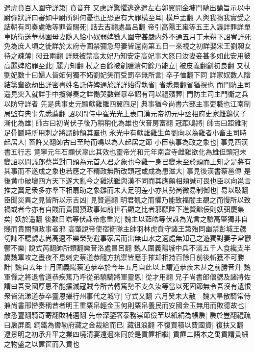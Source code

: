 遣虎賁百人圍守詳第|{
	賁音奔}
又慮詳驚懼逃逸遣左右郭翼開金墉門馳出諭旨示以中尉彈狀詳曰審如中尉所糾何憂也正恐更有大罪橫至耳|{
	橫戶孟翻}
人與我物我實受之詰朝有司奏處皓等罪皆賜死|{
	詰去吉翻處昌呂翻}
帝引高陽王雍等五王入議詳罪詳單車防衛送華林園母妻隨入給小奴弱婢數人圍守甚嚴内外不通五月丁未朔下詔宥詳死免為庶人頃之徙詳於太府寺圍禁彌急母妻皆還南第五日一來視之初詳娶宋王劉昶女待之疎薄|{
	昶丑兩翻}
詳既被禁高太妃乃知安定高妃事大怒曰汝妻妾甚多如此安用彼高麗婢陷罪至此|{
	麗力知翻}
杖之百餘被創膿潰旬餘乃能立|{
	被皮義翻創初良翻}
又杖劉妃數十曰婦人皆妬何獨不妬劉妃笑而受罰卒無所言|{
	卒子恤翻下同}
詳家奴數人陰結黨輩欲劫出詳密書姓名託侍婢通於詳詳始得執省|{
	省悉景翻省猶視也}
而門防主司遥見突入就詳手中攬得奏之詳慟哭數聲暴卒詔有司以禮殯葬|{
	門防主司主門衛之兵以防守詳者}
先是典事史元顯獻雞雛四翼四足|{
	典事猶今尚書六部主事吏職也江南制局監有典事先悉薦翻}
詔以問侍中崔光光上表曰漢元帝初元中丞相府史家雌鷄伏子漸化為雄|{
	師古曰初尚伏子後乃稍稍化為雄也伏音房富翻}
冠距鳴將|{
	師古曰距雞附足骨鬭時所用刺之將謂帥領其羣也}
永光中有獻雄雞生角劉向以為雞者小畜主司時起居人|{
	畜許又翻師古曰至時而鳴以為人起居之節}
小臣執事為政之象也|{
	事見西漢書五行志}
竟寧元年石顯伏辜此其效也靈帝光和元年南宫寺雌雞欲化為雄但頭冠未變詔以問議郎蔡邕對曰頭為元首人君之象也今雞一身已變未至於頭而上知之是將有其事而不遂成之象也若應之不精政無所改頭冠或成為患滋大|{
	事見後漢書蔡邕傳}
是後黄巾破壞四方天下遂大亂今之雞狀雖與漢不同而其應頗相類誠可畏也臣以向邕言推之翼足衆多亦羣下相扇助之象雛而未大足羽差小亦其勢尚微易制御也|{
	易以豉翻}
臣聞災異之見皆所以示吉凶|{
	見賢遍翻}
明君覩之而懼乃能致福闇主覩之而慢所以致禍或者今亦有自賤而貴關預政事如前世石顯之比者邪願陛下進賢黜佞則妖弭慶集矣|{
	妖於遥翻}
後數日皓等伏誅帝愈重光|{
	魏主以茹皓等伏誅為光言之驗高肇獨非自賤而貴關預政事者邪}
高肇說帝使宿衛隊主帥羽林虎賁守諸王第殆同幽禁彭城王勰切諫不聽勰志尚高邁不樂榮勢避事家居而出無山水之適處無知己之遊獨對妻子常鬱鬱不樂|{
	說式芮翻帥所類翻樂音洛處昌呂翻}
魏人圍義陽城中兵不滿五千人食纔支半歲魏軍攻之晝夜不息刺史蔡道恭隨方抗禦皆應手摧却相持百餘日前後斬獲不可勝計|{
	魏自去年十月圍義陽蔡道恭卒於今年五月自此以上謂道恭疾未甚之前勝音升}
魏軍憚之將退會道恭疾篤乃呼從弟驍騎將軍靈恩|{
	從才用翻}
兄子尚書郎僧勰及諸將佐謂曰吾受國厚恩不能攘滅寇賊今所苦轉篤勢不支久汝等當以死固節無令吾沒有遺恨衆皆流涕道恭卒靈恩攝行州事代之城守|{
	守式又翻}
六月癸未大赦　魏大旱散騎常侍兼尚書邢巒奏稱昔者明王重粟帛輕金玉何則粟帛養民而安國金玉無用而敗德故也|{
	散悉亶翻騎奇寄翻敗補邁翻}
先帝深鑒奢泰務崇節儉至以紙絹為帳扆|{
	扆於豈翻禮疏曰扆屏風}
銅鐵為轡勒府藏之金裁給而已|{
	藏徂浪翻}
不復買積以費國資|{
	復扶又翻}
逮景明之初承升平之業四境清宴遠邇來同於是貢篚相繼|{
	貢篚二語本之禹貢謂貴細之物盛之以篚筐而入貢也}
